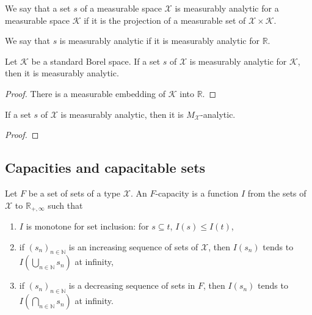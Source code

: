 \begin{definition}\label{def:IsMeasurableAnalytic}
  \leanok
We say that a set $s$ of a measurable space $\mathcal{X}$ is measurably analytic for a measurable space $\mathcal{K}$ if it is the projection of a measurable set of $\mathcal{X} \times \mathcal{K}$.

We say that $s$ is measurably analytic if it is measurably analytic for $\mathbb{R}$.
\end{definition}


\begin{lemma}\label{lem:IsMeasurableAnalyticFor.isMeasurableAnalytic}
  \leanok
Let $\mathcal{K}$ be a standard Borel space.
If a set $s$ of $\mathcal{X}$ is measurably analytic for $\mathcal{K}$, then it is measurably analytic.
\end{lemma}

\begin{proof}\leanok
There is a measurable embedding of $\mathcal{K}$ into $\mathbb{R}$.
\end{proof}


\begin{lemma}\label{lem:IsMeasurableAnalytic.isPavingAnalytic}
  \leanok
If a set $s$ of $\mathcal{X}$ is measurably analytic, then it is $M_{\mathcal{X}}$-analytic.
\end{lemma}

\begin{proof}\leanok

\end{proof}



\subsection{Capacities and capacitable sets}

\begin{definition}\label{def:Capacity}
  \leanok
Let $F$ be a set of sets of a type $\mathcal{X}$.
An $F$-capacity is a function $I$ from the sets of $\mathcal{X}$ to $\mathbb{R}_{+,\infty}$ such that
\begin{enumerate}
  \item $I$ is monotone for set inclusion: for $s \subseteq t$, $I(s) \le I(t)$,
  \item if $(s_n)_{n\in\mathbb{N}}$ is an increasing sequence of sets of $\mathcal{X}$, then $I(s_n)$ tends to $I(\bigcup_{n\in\mathbb{N}} s_n)$ at infinity,
  \item if $(s_n)_{n\in\mathbb{N}}$ is a decreasing sequence of sets in $F$, then $I(s_n)$ tends to $I(\bigcap_{n\in\mathbb{N}} s_n)$ at infinity.
\end{enumerate}
\end{definition}


